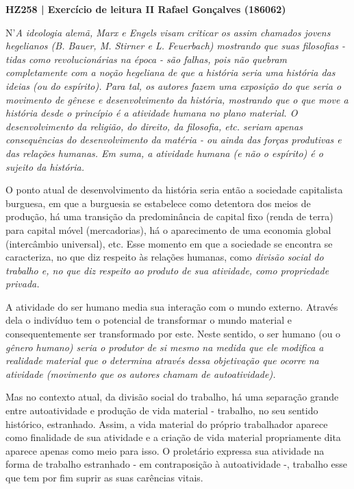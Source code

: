 \documentclass[12pt]{article}
\begin{document}
\noindent
\large\textbf{HZ258 | Exercício de leitura II \hfill Rafael Gonçalves (186062)}
\break\hfill

N'\em A ideologia alemã\em, Marx e Engels visam criticar os assim chamados jovens hegelianos (B. Bauer, M. Stirner e L. Feuerbach) mostrando que suas filosofias - tidas como revolucionárias na época - são falhas, pois não quebram completamente com a noção hegeliana de que a história seria uma história das ideias (ou do espírito).
Para tal, os autores fazem uma exposição do que seria o movimento de gênese e desenvolvimento da história, mostrando que o que move a história desde o princípio é a \em atividade humana \em no plano material.
O desenvolvimento da religião, do direito, da filosofia, etc. seriam apenas consequências do desenvolvimento da matéria - ou ainda das \em forças produtivas \em e das relações humanas.
Em suma, a atividade humana (e não o espírito) é o sujeito da história.

O ponto atual de desenvolvimento da história seria então a sociedade capitalista burguesa, em que a burguesia se estabelece como detentora dos meios de produção, há uma transição da predominância de capital fixo (renda de terra) para capital móvel (mercadorias), há o aparecimento de uma economia global (intercâmbio universal), etc.
Esse momento em que a sociedade se encontra se caracteriza, no que diz respeito às relações humanas, como \em divisão social do trabalho \em e, no que diz respeito ao produto de sua atividade, como \em propriedade privada\em .

A atividade do ser humano media sua interação com o mundo externo. Através dela o indivíduo tem o potencial de transformar o mundo material e consequentemente ser transformado por este.
Neste sentido, o ser humano (ou o \em gênero humano\em) seria o produtor de si mesmo na medida que ele modifica a realidade material que o determina através dessa objetivação que ocorre na atividade (movimento que os autores chamam de \em autoatividade\em).

Mas no contexto atual, da divisão social do trabalho, há uma separação grande entre autoatividade e produção de vida material  - trabalho, no seu sentido histórico, estranhado. Assim, a vida material do próprio trabalhador aparece como finalidade de sua atividade e a criação de vida material propriamente dita aparece apenas como meio para isso.
O proletário expressa sua atividade na forma de trabalho estranhado - em contraposição à autoatividade -, trabalho esse que tem por fim suprir as suas carências vitais.
\end{document}
